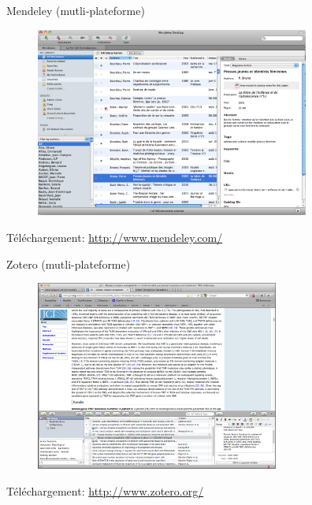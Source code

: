 \documentclass{beamer}
\begin{document}

\begin{frame}{Mendeley (mutli-plateforme)}

\begin{figure} %
\centering %
\includegraphics[width=9cm]{img/mendeley} %
\end{figure} %

{\footnotesize Téléchargement: \url{http://www.mendeley.com/}}

\end{frame}


\begin{frame}{Zotero (mutli-plateforme)}

\begin{figure} %
\centering %
\includegraphics[width=8cm]{img/zotero} %
\end{figure} %

{\footnotesize Téléchargement: \url{http://www.zotero.org/}}

\end{frame}
\end{document}
